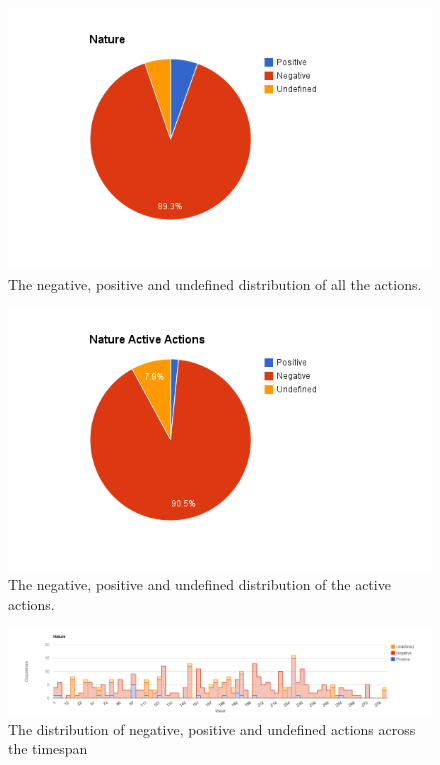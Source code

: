 \begin{figure}[!h]
	\centering
	\includegraphics[width=\textwidth, keepaspectratio]{figures/nature-p.png}
	\caption{The negative, positive and undefined distribution of all the actions.}
	\label{figure:nature-p}
\end{figure}

\begin{figure}[!h]
	\centering
	\includegraphics[width=\textwidth, keepaspectratio]{figures/nature-pa.png}
	\caption{The negative, positive and undefined distribution of the active actions.}
	\label{figure:nature-pa}
\end{figure}

\begin{figure}
	\centering
	\includegraphics[width=\textwidth, keepaspectratio]{figures/nature-l.png}
	\caption{The distribution of negative, positive and undefined actions across the timespan}
	\label{figure:nature-la}
\end{figure}

